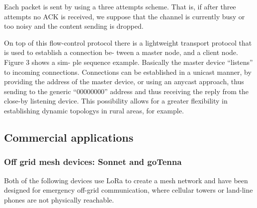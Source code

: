 		Each packet is sent by using a three attempts scheme. That
		is, if after three attempts no ACK is received, we suppose
		that the channel is currently busy or too noisy and the content
		sending is dropped.
		
		On top of this ﬂow-control protocol there is a lightweight
		transport protocol that is used to establish a connection be-
		tween a master node, and a client node. Figure 3 shows a sim-
		ple sequence example. Basically the master device “listens”
		to incoming connections. Connections can be established in a
		unicast manner, by providing the address of the master device,
		or using an anycast approach, thus sending to the generic
		“00000000” address and thus receiving the reply from the
		close-by listening device. This possibility allows for a greater
		ﬂexibility in establishing dynamic topologys in rural areas, for
		example.
		

		\subsection{Commercial applications}

			\subsubsection{Off grid mesh devices: Sonnet and goTenna}
			
				Both of the following devices use LoRa to create a mesh network and have been designed for emergency off-grid communication, where cellular towers or land-line phones are not physically reachable.
				
